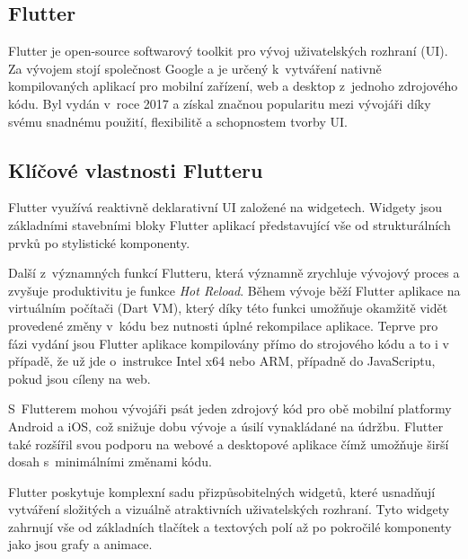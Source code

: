 \subsection{Flutter}
Flutter je open-source softwarový toolkit pro vývoj uživatelských rozhraní (UI). \cite{flutterfaq} Za vývojem stojí společnost Google a je určený k~vytváření nativně kompilovaných 
aplikací pro mobilní zařízení, web a desktop z~jednoho zdrojového kódu. \cite{flutterfaq}
Byl vydán v~roce 2017 a získal značnou popularitu mezi vývojáři díky svému snadnému použití, flexibilitě a schopnostem tvorby UI.

\subsection*{Klíčové vlastnosti Flutteru}

Flutter využívá reaktivně deklarativní UI založené na widgetech. \cite{flutterUI} Widgety jsou základními stavebními 
bloky Flutter aplikací představující vše od strukturálních prvků po stylistické komponenty. \cite{flutterWidgets}

Další z~významných funkcí Flutteru, která významně zrychluje vývojový proces a zvyšuje produktivitu je funkce \textit{Hot Reload}. 
Během vývoje běží Flutter aplikace na virtuálním počítači (Dart VM), který díky této funkci umožňuje okamžitě vidět provedené změny
v~kódu bez nutnosti úplné rekompilace aplikace. \cite{flutterHotReload} Teprve pro fázi vydání jsou Flutter aplikace kompilovány přímo do strojového kódu a to 
i v případě, že už jde o~instrukce Intel x64 nebo ARM, případně do JavaScriptu, pokud jsou cíleny na web. \cite{flutterArchOverview}


S~Flutterem mohou vývojáři psát jeden zdrojový kód pro obě mobilní platformy Android a iOS, což snižuje dobu vývoje a úsilí 
vynakládané na údržbu. Flutter také rozšířil svou podporu na webové a desktopové aplikace čímž umožňuje širší dosah s~minimálními změnami kódu. \cite{flutter}

Flutter poskytuje komplexní sadu přizpůsobitelných widgetů, které usnadňují vytváření složitých a vizuálně 
atraktivních uživatelských rozhraní. Tyto widgety zahrnují vše od základních tlačítek a textových polí až po 
pokročilé komponenty jako jsou grafy a animace. \cite{flutterWidgets2}

